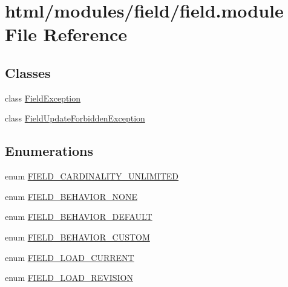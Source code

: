 \hypertarget{field_8module}{
\section{html/modules/field/field.module File Reference}
\label{field_8module}
}
\subsection*{Classes}
\begin{DoxyCompactItemize}
\item 
class \hyperlink{classFieldException}{FieldException}
\item 
class \hyperlink{classFieldUpdateForbiddenException}{FieldUpdateForbiddenException}
\end{DoxyCompactItemize}
\subsection*{Enumerations}
\begin{DoxyCompactItemize}
\item 
enum \hyperlink{group__field_gac14c9ab18aca82aebcbc6cfa511964fc}{FIELD\_\-CARDINALITY\_\-UNLIMITED} 
\item 
enum \hyperlink{group__field_gabff95904b186d355153ceda1f3941975}{FIELD\_\-BEHAVIOR\_\-NONE} 
\item 
enum \hyperlink{group__field_ga9549af1a8f86107fbafc0e3425ec7629}{FIELD\_\-BEHAVIOR\_\-DEFAULT} 
\item 
enum \hyperlink{group__field_gae4cb2db55750703aae033c7b2cd8c465}{FIELD\_\-BEHAVIOR\_\-CUSTOM} 
\item 
enum \hyperlink{group__field_ga39b9fb0d47b181607a4d981a9bccbe8a}{FIELD\_\-LOAD\_\-CURRENT} 
\item 
enum \hyperlink{group__field_ga6eae4d17256be446f837da1a360f0096}{FIELD\_\-LOAD\_\-REVISION} 
\end{DoxyCompactItemize}
